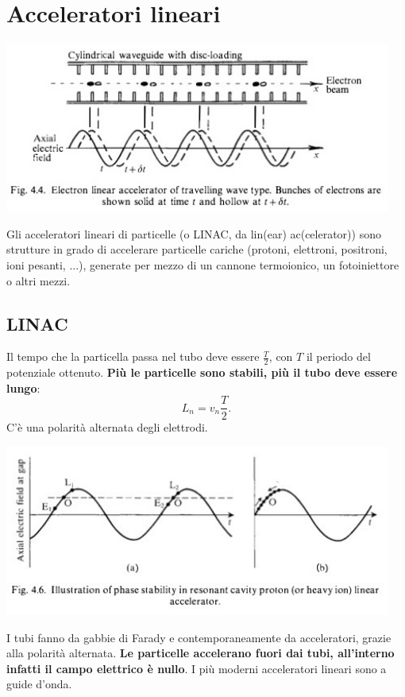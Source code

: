 \documentclass[a4paper,11pt,twoside,openany]{book}
\theoremstyle{definition}
\theoremstyle{plain}
\theoremstyle{plain}
\theoremstyle{definition}
\begin{document}
\section{Acceleratori lineari} %

\begin{center}
\includegraphics[width=5in]{immagini/linac.jpg} %
\end{center}

Gli acceleratori lineari di particelle (o LINAC, da lin(ear) ac(celerator)) sono strutture in grado di accelerare particelle cariche (protoni, elettroni, positroni, ioni pesanti, ...), generate per mezzo di un cannone termoionico, un fotoiniettore o altri mezzi.

\subsection{LINAC} %
Il tempo che la particella passa nel tubo deve essere $\frac{T}{2}$, con $T$ il periodo del potenziale ottenuto. \textbf{Più le particelle sono stabili, più il tubo deve essere lungo}: $$L_n=v_n\frac{T}{2}.$$ C'è una polarità alternata degli elettrodi.

\begin{center}
\includegraphics[width=5in]{immagini/linac_2.jpg} %
\end{center}

I tubi fanno da gabbie di Farady e contemporaneamente da acceleratori, grazie alla polarità alternata. \textbf{Le particelle accelerano fuori dai tubi, all'interno infatti il campo elettrico è nullo}. I più moderni acceleratori lineari sono a guide d'onda.
\end{document}
